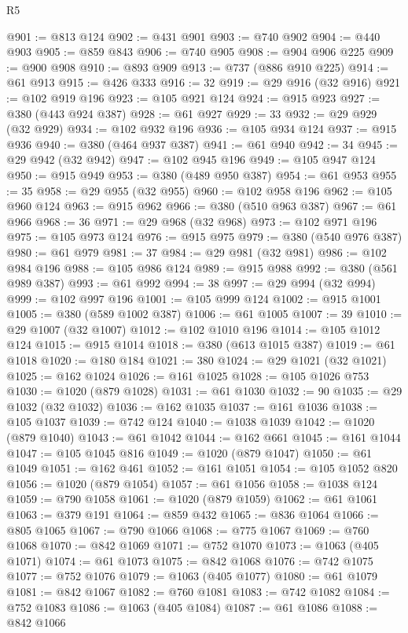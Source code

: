 \begin{lexlean}{R5}
\begin{coremodule}
@901 := @813 @124
@902 := @431 @901
@903 := @740 @902
@904 := @440 @903
@905 := @859 @843
@906 := @740 @905
@908 := @904 @906 @225
@909 := @900 @908
@910 := @893 @909
@913 := @737 (@886 @910 @225)
@914 := @61 @913
@915 := @426 @333
@916 := 32
@919 := @29 @916 (@32 @916)
@921 := @102 @919 @196
@923 := @105 @921 @124
@924 := @915 @923
@927 := @380 (@443 @924 @387)
@928 := @61 @927
@929 := 33
@932 := @29 @929 (@32 @929)
@934 := @102 @932 @196
@936 := @105 @934 @124
@937 := @915 @936
@940 := @380 (@464 @937 @387)
@941 := @61 @940
@942 := 34
@945 := @29 @942 (@32 @942)
@947 := @102 @945 @196
@949 := @105 @947 @124
@950 := @915 @949
@953 := @380 (@489 @950 @387)
@954 := @61 @953
@955 := 35
@958 := @29 @955 (@32 @955)
@960 := @102 @958 @196
@962 := @105 @960 @124
@963 := @915 @962
@966 := @380 (@510 @963 @387)
@967 := @61 @966
@968 := 36
@971 := @29 @968 (@32 @968)
@973 := @102 @971 @196
@975 := @105 @973 @124
@976 := @915 @975
@979 := @380 (@540 @976 @387)
@980 := @61 @979
@981 := 37
@984 := @29 @981 (@32 @981)
@986 := @102 @984 @196
@988 := @105 @986 @124
@989 := @915 @988
@992 := @380 (@561 @989 @387)
@993 := @61 @992
@994 := 38
@997 := @29 @994 (@32 @994)
@999 := @102 @997 @196
@1001 := @105 @999 @124
@1002 := @915 @1001
@1005 := @380 (@589 @1002 @387)
@1006 := @61 @1005
@1007 := 39
@1010 := @29 @1007 (@32 @1007)
@1012 := @102 @1010 @196
@1014 := @105 @1012 @124
@1015 := @915 @1014
@1018 := @380 (@613 @1015 @387)
@1019 := @61 @1018
@1020 := @180 @184
@1021 := 380
@1024 := @29 @1021 (@32 @1021)
@1025 := @162 @1024
@1026 := @161 @1025
@1028 := @105 @1026 @753
@1030 := @1020 (@879 @1028)
@1031 := @61 @1030
@1032 := 90
@1035 := @29 @1032 (@32 @1032)
@1036 := @162 @1035
@1037 := @161 @1036
@1038 := @105 @1037
@1039 := @742 @124
@1040 := @1038 @1039
@1042 := @1020 (@879 @1040)
@1043 := @61 @1042
@1044 := @162 @661
@1045 := @161 @1044
@1047 := @105 @1045 @816
@1049 := @1020 (@879 @1047)
@1050 := @61 @1049
@1051 := @162 @461
@1052 := @161 @1051
@1054 := @105 @1052 @820
@1056 := @1020 (@879 @1054)
@1057 := @61 @1056
@1058 := @1038 @124
@1059 := @790 @1058
@1061 := @1020 (@879 @1059)
@1062 := @61 @1061
@1063 := @379 @191
@1064 := @859 @432
@1065 := @836 @1064
@1066 := @805 @1065
@1067 := @790 @1066
@1068 := @775 @1067
@1069 := @760 @1068
@1070 := @842 @1069
@1071 := @752 @1070
@1073 := @1063 (@405 @1071)
@1074 := @61 @1073
@1075 := @842 @1068
@1076 := @742 @1075
@1077 := @752 @1076
@1079 := @1063 (@405 @1077)
@1080 := @61 @1079
@1081 := @842 @1067
@1082 := @760 @1081
@1083 := @742 @1082
@1084 := @752 @1083
@1086 := @1063 (@405 @1084)
@1087 := @61 @1086
@1088 := @842 @1066

\end{coremodule}
\end{lexlean}
